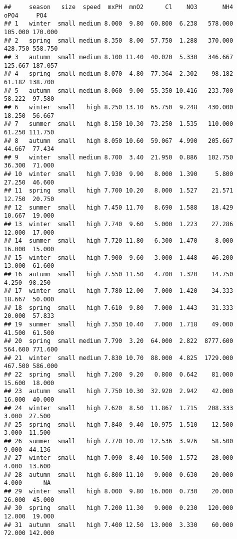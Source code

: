 \documentclass[
]{article}
\begin{document}
\begin{verbatim}
##     season   size  speed  mxPH  mnO2      Cl    NO3       NH4    oPO4     PO4
## 1   winter  small medium 8.000  9.80  60.800  6.238   578.000 105.000 170.000
## 2   spring  small medium 8.350  8.00  57.750  1.288   370.000 428.750 558.750
## 3   autumn  small medium 8.100 11.40  40.020  5.330   346.667 125.667 187.057
## 4   spring  small medium 8.070  4.80  77.364  2.302    98.182  61.182 138.700
## 5   autumn  small medium 8.060  9.00  55.350 10.416   233.700  58.222  97.580
## 6   winter  small   high 8.250 13.10  65.750  9.248   430.000  18.250  56.667
## 7   summer  small   high 8.150 10.30  73.250  1.535   110.000  61.250 111.750
## 8   autumn  small   high 8.050 10.60  59.067  4.990   205.667  44.667  77.434
## 9   winter  small medium 8.700  3.40  21.950  0.886   102.750  36.300  71.000
## 10  winter  small   high 7.930  9.90   8.000  1.390     5.800  27.250  46.600
## 11  spring  small   high 7.700 10.20   8.000  1.527    21.571  12.750  20.750
## 12  summer  small   high 7.450 11.70   8.690  1.588    18.429  10.667  19.000
## 13  winter  small   high 7.740  9.60   5.000  1.223    27.286  12.000  17.000
## 14  summer  small   high 7.720 11.80   6.300  1.470     8.000  16.000  15.000
## 15  winter  small   high 7.900  9.60   3.000  1.448    46.200  13.000  61.600
## 16  autumn  small   high 7.550 11.50   4.700  1.320    14.750   4.250  98.250
## 17  winter  small   high 7.780 12.00   7.000  1.420    34.333  18.667  50.000
## 18  spring  small   high 7.610  9.80   7.000  1.443    31.333  20.000  57.833
## 19  summer  small   high 7.350 10.40   7.000  1.718    49.000  41.500  61.500
## 20  spring  small medium 7.790  3.20  64.000  2.822  8777.600 564.600 771.600
## 21  winter  small medium 7.830 10.70  88.000  4.825  1729.000 467.500 586.000
## 22  spring  small   high 7.200  9.20   0.800  0.642    81.000  15.600  18.000
## 23  autumn  small   high 7.750 10.30  32.920  2.942    42.000  16.000  40.000
## 24  winter  small   high 7.620  8.50  11.867  1.715   208.333   3.000  27.500
## 25  spring  small   high 7.840  9.40  10.975  1.510    12.500   3.000  11.500
## 26  summer  small   high 7.770 10.70  12.536  3.976    58.500   9.000  44.136
## 27  winter  small   high 7.090  8.40  10.500  1.572    28.000   4.000  13.600
## 28  autumn  small   high 6.800 11.10   9.000  0.630    20.000   4.000      NA
## 29  winter  small   high 8.000  9.80  16.000  0.730    20.000  26.000  45.000
## 30  spring  small   high 7.200 11.30   9.000  0.230   120.000  12.000  19.000
## 31  autumn  small   high 7.400 12.50  13.000  3.330    60.000  72.000 142.000

\end{verbatim}
\end{document}
